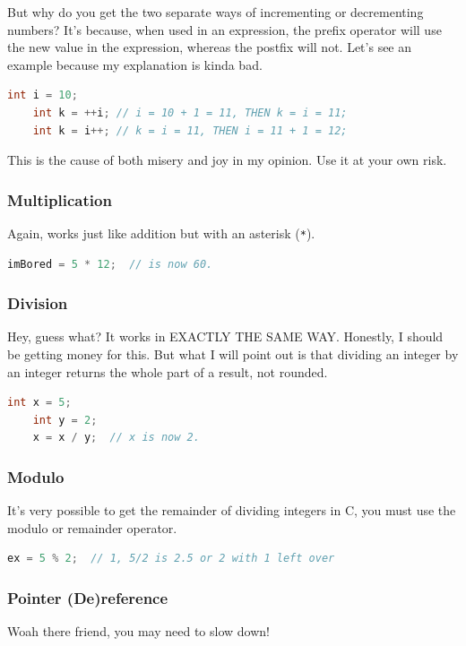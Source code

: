 But why do you get the two separate ways of incrementing or decrementing numbers? It's because, when used in an expression, the prefix operator will use the new value in the expression, whereas the postfix will not. Let's see an example because my explanation is kinda bad.
\begin{lstlisting}[language=C]
    int i = 10;
    int k = ++i; // i = 10 + 1 = 11, THEN k = i = 11;
    int k = i++; // k = i = 11, THEN i = 11 + 1 = 12;
\end{lstlisting}
This is the cause of both misery and joy in my opinion. Use it at your own risk.

\subsubsection{Multiplication}
Again, works just like addition but with an asterisk (\texttt{*}).
\begin{lstlisting}[language=C]
    imBored = 5 * 12;  // is now 60.
\end{lstlisting}

\subsubsection{Division}
Hey, guess what? It works in EXACTLY THE SAME WAY. Honestly, I should be getting money for this. But what I will point out is that dividing an integer by an integer returns the whole part of a result, not rounded.
\begin{lstlisting}[language=C]
    int x = 5;
    int y = 2;
    x = x / y;  // x is now 2.
\end{lstlisting}

\subsubsection{Modulo}
It's very possible to get the remainder of dividing integers in C, you must use the modulo or remainder operator.
\begin{lstlisting}[language=C]
    ex = 5 % 2;  // 1, 5/2 is 2.5 or 2 with 1 left over
\end{lstlisting}

\subsubsection{Pointer (De)reference}
Woah there friend, you may need to slow down!

